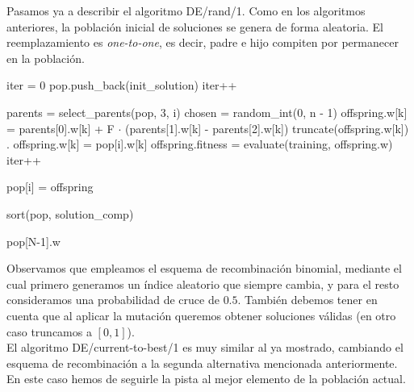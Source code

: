 \documentclass[12pt]{article}
\begin{document}
Pasamos ya a describir el algoritmo DE/rand/1. Como en los algoritmos anteriores, la población inicial de soluciones se genera de forma aleatoria. El reemplazamiento es \textit{one-to-one}, es decir, padre e hijo compiten por permanecer en la población.

\begin{algorithm}[h!]
\begin{algorithmic}

\State iter = 0
 
    \State pop.push\_back(init\_solution)
    \State iter++
\EndFor

        \State parents = select\_parents(pop, 3, i)
        \State chosen = random\_int(0, n - 1) 
             
                \State offspring.w[k] = parents[0].w[k] + F $\cdot$ (parents[1].w[k] - parents[2].w[k])
             \State truncate(offspring.w[k])  .
            \Else
                \State offspring.w[k] = pop[i].w[k]
            \EndIf
        \EndFor
        \State offspring.fitness = evaluate(training, offspring.w)
        \State iter++
        
         
            \State pop[i] = offspring
        \EndIf
    \EndFor
\EndWhile

\State sort(pop, solution\_comp) 

\State \Return pop[N-1].w
\EndFunction
\end{algorithmic}
\end{algorithm}

Observamos que empleamos el esquema de recombinación binomial, mediante el cual primero generamos un índice aleatorio que siempre cambia, y para el resto consideramos una probabilidad de cruce de $0.5$. También debemos tener en cuenta que al aplicar la mutación queremos obtener soluciones válidas (en otro caso truncamos a $[0,1]$).\\

El algoritmo DE/current-to-best/1 es muy similar al ya mostrado, cambiando el esquema de recombinación a la segunda alternativa mencionada anteriormente. En este caso hemos de seguirle la pista al mejor elemento de la población actual.
\end{document}
